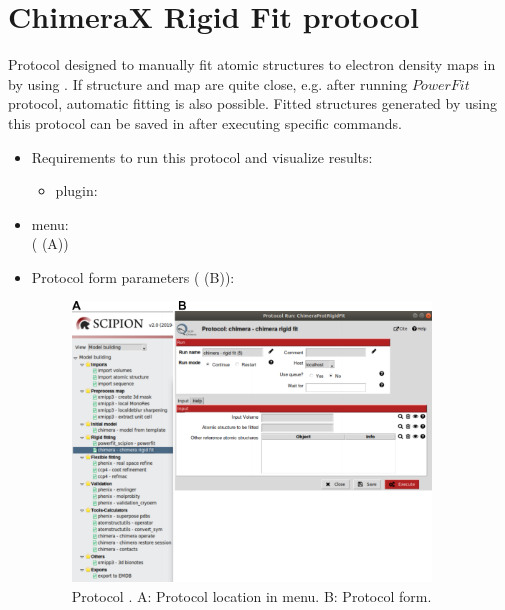 \section{ChimeraX Rigid Fit protocol}
\label{app:chimeraRigidFit}%
Protocol designed to manually fit atomic structures to electron density maps in \scipion by using \chimera. If structure and map are quite close, e.g. after running $PowerFit$ protocol, automatic fitting is also possible. Fitted structures generated by using this protocol can be saved in \scipion after executing specific \chimera commands.
   
 \begin{itemize}
  \item Requirements to run this protocol and visualize results:
    \begin{itemize}
        \item \scipion plugin: 
    \end{itemize}
  \item \scipion menu:\\
    ( (A))
  
  \item Protocol form parameters ( (B)):
  
    \begin{figure}[H]
     \centering 
     \captionsetup{width=.7\linewidth} 
     \includegraphics[width=0.90\textwidth]{Images_appendix/Fig116.pdf}
     \caption{Protocol . A: Protocol location in \scipion menu. B: Protocol form.}
     \label{fig:app_protocol_chimera_1}
    \end{figure}
    

\end{itemize}
